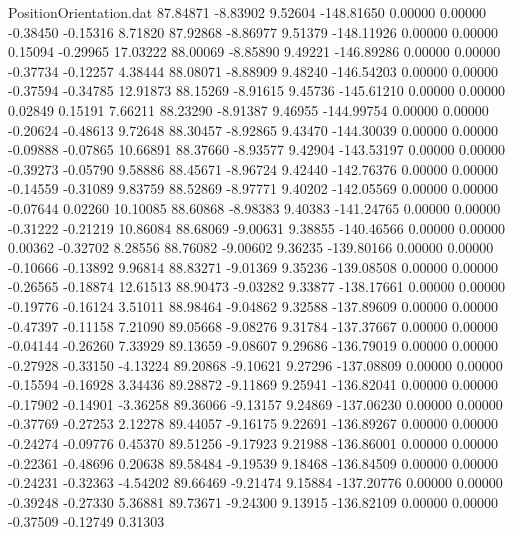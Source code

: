 \begin{filecontents}{PositionOrientation.dat}
  87.84871   -8.83902    9.52604  -148.81650    0.00000    0.00000   -0.38450   -0.15316    8.71820
  87.92868   -8.86977    9.51379  -148.11926    0.00000    0.00000    0.15094   -0.29965   17.03222
  88.00069   -8.85890    9.49221  -146.89286    0.00000    0.00000   -0.37734   -0.12257    4.38444
  88.08071   -8.88909    9.48240  -146.54203    0.00000    0.00000   -0.37594   -0.34785   12.91873
  88.15269   -8.91615    9.45736  -145.61210    0.00000    0.00000    0.02849    0.15191    7.66211
  88.23290   -8.91387    9.46955  -144.99754    0.00000    0.00000   -0.20624   -0.48613    9.72648
  88.30457   -8.92865    9.43470  -144.30039    0.00000    0.00000   -0.09888   -0.07865   10.66891
  88.37660   -8.93577    9.42904  -143.53197    0.00000    0.00000   -0.39273   -0.05790    9.58886
  88.45671   -8.96724    9.42440  -142.76376    0.00000    0.00000   -0.14559   -0.31089    9.83759
  88.52869   -8.97771    9.40202  -142.05569    0.00000    0.00000   -0.07644    0.02260   10.10085
  88.60868   -8.98383    9.40383  -141.24765    0.00000    0.00000   -0.31222   -0.21219   10.86084
  88.68069   -9.00631    9.38855  -140.46566    0.00000    0.00000    0.00362   -0.32702    8.28556
  88.76082   -9.00602    9.36235  -139.80166    0.00000    0.00000   -0.10666   -0.13892    9.96814
  88.83271   -9.01369    9.35236  -139.08508    0.00000    0.00000   -0.26565   -0.18874   12.61513
  88.90473   -9.03282    9.33877  -138.17661    0.00000    0.00000   -0.19776   -0.16124    3.51011
  88.98464   -9.04862    9.32588  -137.89609    0.00000    0.00000   -0.47397   -0.11158    7.21090
  89.05668   -9.08276    9.31784  -137.37667    0.00000    0.00000   -0.04144   -0.26260    7.33929
  89.13659   -9.08607    9.29686  -136.79019    0.00000    0.00000   -0.27928   -0.33150   -4.13224
  89.20868   -9.10621    9.27296  -137.08809    0.00000    0.00000   -0.15594   -0.16928    3.34436
  89.28872   -9.11869    9.25941  -136.82041    0.00000    0.00000   -0.17902   -0.14901   -3.36258
  89.36066   -9.13157    9.24869  -137.06230    0.00000    0.00000   -0.37769   -0.27253    2.12278
  89.44057   -9.16175    9.22691  -136.89267    0.00000    0.00000   -0.24274   -0.09776    0.45370
  89.51256   -9.17923    9.21988  -136.86001    0.00000    0.00000   -0.22361   -0.48696    0.20638
  89.58484   -9.19539    9.18468  -136.84509    0.00000    0.00000   -0.24231   -0.32363   -4.54202
  89.66469   -9.21474    9.15884  -137.20776    0.00000    0.00000   -0.39248   -0.27330    5.36881
  89.73671   -9.24300    9.13915  -136.82109    0.00000    0.00000   -0.37509   -0.12749    0.31303

\end{filecontents}
